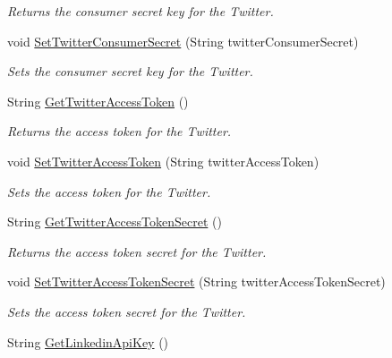 \begin{DoxyCompactItemize}
\begin{DoxyCompactList}\small\item\em Returns the consumer secret key for the Twitter. \end{DoxyCompactList}\item 
void \hyperlink{classcom_1_1shephertz_1_1app42_1_1paas_1_1sdk_1_1csharp_1_1social_1_1_social_ac611f11792de7d3fe88cfe3819405e88}{Set\+Twitter\+Consumer\+Secret} (String twitter\+Consumer\+Secret)
\begin{DoxyCompactList}\small\item\em Sets the consumer secret key for the Twitter. \end{DoxyCompactList}\item 
String \hyperlink{classcom_1_1shephertz_1_1app42_1_1paas_1_1sdk_1_1csharp_1_1social_1_1_social_a32fb22cae781c2646cb419803e7a7ecd}{Get\+Twitter\+Access\+Token} ()
\begin{DoxyCompactList}\small\item\em Returns the access token for the Twitter. \end{DoxyCompactList}\item 
void \hyperlink{classcom_1_1shephertz_1_1app42_1_1paas_1_1sdk_1_1csharp_1_1social_1_1_social_ad35993b3fed47045cd96185cf1cbcbf3}{Set\+Twitter\+Access\+Token} (String twitter\+Access\+Token)
\begin{DoxyCompactList}\small\item\em Sets the access token for the Twitter. \end{DoxyCompactList}\item 
String \hyperlink{classcom_1_1shephertz_1_1app42_1_1paas_1_1sdk_1_1csharp_1_1social_1_1_social_a6916380cd1559cd1245b503929d56fd4}{Get\+Twitter\+Access\+Token\+Secret} ()
\begin{DoxyCompactList}\small\item\em Returns the access token secret for the Twitter. \end{DoxyCompactList}\item 
void \hyperlink{classcom_1_1shephertz_1_1app42_1_1paas_1_1sdk_1_1csharp_1_1social_1_1_social_ae1afffab3eab3f1079358ffc991bd96c}{Set\+Twitter\+Access\+Token\+Secret} (String twitter\+Access\+Token\+Secret)
\begin{DoxyCompactList}\small\item\em Sets the access token secret for the Twitter. \end{DoxyCompactList}\item 
String \hyperlink{classcom_1_1shephertz_1_1app42_1_1paas_1_1sdk_1_1csharp_1_1social_1_1_social_a8b8fa7a044c4a2cc315ab458fcf3c927}{Get\+Linkedin\+Api\+Key} ()

\end{DoxyCompactItemize}
